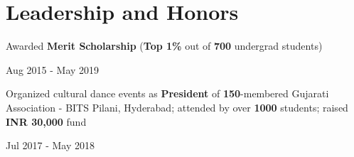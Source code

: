 \documentclass[]{Keval-resume}
\begin{document}
\section{Leadership and Honors} 
\hrulefill
\postsectionsep 

\begin{minipage}[t]{.78\textwidth}
	\textbullet{} Awarded \textbf{Merit Scholarship} (\textbf{Top 1\%} out of \textbf{700} undergrad students)
\end{minipage}%
\begin{minipage}[t]{.22\textwidth}
	\hfill Aug 2015 - May 2019
\end{minipage}

\begin{minipage}[t]{.78\textwidth}
	\textbullet{} Organized cultural dance events as \textbf{President} of \textbf{150}-membered Gujarati Association - BITS Pilani, Hyderabad; attended by over \textbf{1000} students; raised \textbf{INR 30,000} fund
\end{minipage}%
\begin{minipage}[t]{.22\textwidth}
	\hfill Jul 2017 - May 2018
\end{minipage}


\end{document}
